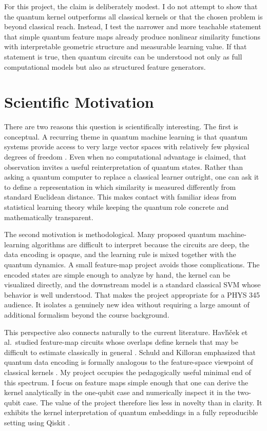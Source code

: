 \documentclass[11pt]{article}
\begin{document}
For this project, the claim is deliberately modest. I do not attempt to show that the quantum kernel outperforms all classical kernels or that the chosen problem is beyond classical reach. Instead, I test the narrower and more teachable statement that simple quantum feature maps already produce nonlinear similarity functions with interpretable geometric structure and measurable learning value. If that statement is true, then quantum circuits can be understood not only as full computational models but also as structured feature generators.

\section{Scientific Motivation}

There are two reasons this question is scientifically interesting. The first is conceptual. A recurring theme in quantum machine learning is that quantum systems provide access to very large vector spaces with relatively few physical degrees of freedom \cite{schuld2019feature, havlicek2019feature}. Even when no computational advantage is claimed, that observation invites a useful reinterpretation of quantum states. Rather than asking a quantum computer to replace a classical learner outright, one can ask it to define a representation in which similarity is measured differently from standard Euclidean distance. This makes contact with familiar ideas from statistical learning theory while keeping the quantum role concrete and mathematically transparent.

The second motivation is methodological. Many proposed quantum machine-learning algorithms are difficult to interpret because the circuits are deep, the data encoding is opaque, and the learning rule is mixed together with the quantum dynamics. A small feature-map project avoids those complications. The encoded states are simple enough to analyze by hand, the kernel can be visualized directly, and the downstream model is a standard classical SVM whose behavior is well understood. That makes the project appropriate for a PHYS 345 audience. It isolates a genuinely new idea without requiring a large amount of additional formalism beyond the course background.

This perspective also connects naturally to the current literature. Havl\'{\i}\v{c}ek et al.\ studied feature-map circuits whose overlaps define kernels that may be difficult to estimate classically in general \cite{havlicek2019feature}. Schuld and Killoran emphasized that quantum data encoding is formally analogous to the feature-space viewpoint of classical kernels \cite{schuld2019feature}. My project occupies the pedagogically useful minimal end of this spectrum. I focus on feature maps simple enough that one can derive the kernel analytically in the one-qubit case and numerically inspect it in the two-qubit case. The value of the project therefore lies less in novelty than in clarity. It exhibits the kernel interpretation of quantum embeddings in a fully reproducible setting using Qiskit \cite{qiskitdocs, qiskitkerneldocs}.
\end{document}
